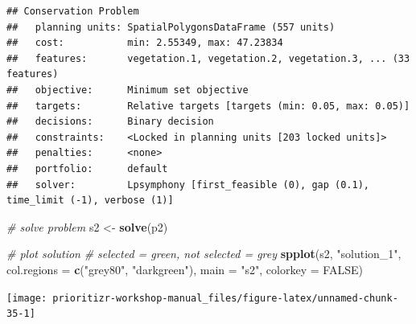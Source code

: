 \documentclass[12pt,]{book}
\newenvironment{Shaded}{\begin{snugshade}}{\end{snugshade}}
\newcommand{\KeywordTok}[1]{\textcolor[rgb]{0.13,0.29,0.53}{\textbf{#1}}}
\newcommand{\DataTypeTok}[1]{\textcolor[rgb]{0.13,0.29,0.53}{#1}}
\newcommand{\FloatTok}[1]{\textcolor[rgb]{0.00,0.00,0.81}{#1}}
\newcommand{\StringTok}[1]{\textcolor[rgb]{0.31,0.60,0.02}{#1}}
\newcommand{\CommentTok}[1]{\textcolor[rgb]{0.56,0.35,0.01}{\textit{#1}}}
\newcommand{\OtherTok}[1]{\textcolor[rgb]{0.56,0.35,0.01}{#1}}
\newcommand{\OperatorTok}[1]{\textcolor[rgb]{0.81,0.36,0.00}{\textbf{#1}}}
\newcommand{\NormalTok}[1]{#1}
\begin{document}
\begin{Shaded}
\end{Shaded}

\begin{verbatim}
## Conservation Problem
##   planning units: SpatialPolygonsDataFrame (557 units)
##   cost:           min: 2.55349, max: 47.23834
##   features:       vegetation.1, vegetation.2, vegetation.3, ... (33 features)
##   objective:      Minimum set objective 
##   targets:        Relative targets [targets (min: 0.05, max: 0.05)]
##   decisions:      Binary decision 
##   constraints:    <Locked in planning units [203 locked units]>
##   penalties:      <none>
##   portfolio:      default
##   solver:         Lpsymphony [first_feasible (0), gap (0.1), time_limit (-1), verbose (1)]
\end{verbatim}

\begin{Shaded}
\begin{Highlighting}[]
\CommentTok{# solve problem}
\NormalTok{s2 <-}\StringTok{ }\KeywordTok{solve}\NormalTok{(p2)}

\CommentTok{# plot solution}
\CommentTok{# selected = green, not selected = grey}
\KeywordTok{spplot}\NormalTok{(s2, }\StringTok{"solution_1"}\NormalTok{, }\DataTypeTok{col.regions =} \KeywordTok{c}\NormalTok{(}\StringTok{"grey80"}\NormalTok{, }\StringTok{"darkgreen"}\NormalTok{), }\DataTypeTok{main =} \StringTok{"s2"}\NormalTok{,}
       \DataTypeTok{colorkey =} \OtherTok{FALSE}\NormalTok{)}
\end{Highlighting}
\end{Shaded}

\begin{center}\texttt{[image: prioritizr-workshop-manual\_files/figure-latex/unnamed-chunk-35-1]} \end{center}
\end{document}
